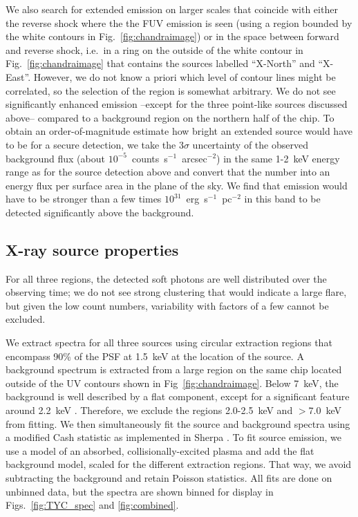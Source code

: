 \documentclass[linenumbers]{aastex631}
\begin{document}
We also search for extended emission on larger scales that coincide with either the reverse shock where the the FUV emission is seen (using a region bounded by the white contours  in Fig.~\ref{fig:chandraimage}) or in the space between forward and reverse shock, i.e.\ in a ring on the outside of the white contour in Fig.~\ref{fig:chandraimage} that contains the sources labelled ``X-North'' and ``X-East''. However, we do not know a priori which level of contour lines might be correlated, so the selection of the region is somewhat arbitrary. We do not see significantly enhanced emission --except for the three point-like sources discussed above-- compared to a background region on the northern half of the chip. To obtain an order-of-magnitude estimate how bright an extended source would have to be for a secure detection, we take the $3\sigma$ uncertainty of the observed background flux (about $10^{-5}$~counts~s$^{-1}$~arcsec$^{-2}$) in the same 1-2~keV energy range as for the source detection above and convert that the number into an energy flux per surface area in the plane of the sky. We find that emission would have to be stronger than a few times $10^{31}$~erg~s$^{-1}$~pc$^{-2}$ in this band to be detected significantly above the background.

\subsection{X-ray source properties}
\label{sec:xrayspectra}
For all three regions, the detected soft photons are well distributed over the observing time; we do not see strong clustering that would indicate a large flare, but given the low count numbers, variability with factors of a few cannot be excluded.

We extract spectra for all three sources using circular extraction regions that encompass 90\% of the PSF at 1.5~keV at the location of the source. A background spectrum is extracted from a large region on the same chip located outside of the UV contours shown in Fig~\ref{fig:chandraimage}. Below 7~keV, the background is well described by a flat component, except for a significant feature around 2.2~keV \citep[caused by fluorescence of gold in the instrument,][]{2021arXiv210811234S}. Therefore, we exclude the regions 2.0-2.5~keV and $>7.0$~keV from fitting. We then simultaneously fit the source and background spectra using a modified Cash statistic \citep{1979ApJ...228..939C} as implemented in Sherpa \citep{2007ASPC..376..543D,doug_burke_2021_4428938}. To fit source emission, we use a model of an absorbed, collisionally-excited plasma \citep[APEC model,][]{2012ApJ...756..128F} and add the flat background model, scaled for the different extraction regions. That way, we avoid subtracting the background and retain Poisson statistics. All fits are done on unbinned data, but the spectra are shown binned for display in Figs.~\ref{fig:TYC_spec} and \ref{fig:combined}.
\end{document}
